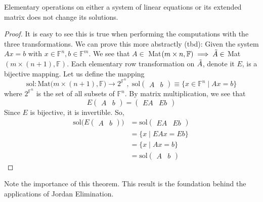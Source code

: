   \begin{theorem}
    Elementary operations on either a system of linear equations or its extended matrix does not change its solutions. 
  \end{theorem}
  \begin{proof}
    It is easy to see this is true when performing the computations with the three transformations. We can prove this more abstractly (tbd): Given the system $A x = b$ with $x \in \mathbb{F}^n, b \in \mathbb{F}^m$. We see that $A \in $ Mat$(m \times n, \mathbb{F}) \implies \Tilde{A} \in$ Mat$(m \times (n+1), \mathbb{F})$. Each elementary row transformation on $\Tilde{A}$, denote it $E$, is a bijective mapping. Let us define the mapping 
    \begin{equation}
      \text{sol}: \text{Mat}\big( m \times (n+1), \mathbb{F} \big) \longrightarrow 2^{\mathbb{F}^n}, \; \text{sol} \begin{pmatrix}
      A & b
      \end{pmatrix} \equiv \{ x\in \mathbb{F}^n \; | \; A x = b\} 
    \end{equation}
    where $2^{\mathbb{F}^n}$ is the set of all subsets of $\mathbb{F}^n$. By matrix multiplication, we see that 
    \begin{equation}
       E \begin{pmatrix}
      A & b
      \end{pmatrix} = \begin{pmatrix}
      E A & E b
      \end{pmatrix}
    \end{equation}
    Since $E$ is bijective, it is invertible. So, 
    \begin{align} 
      \text{sol} \big( E \begin{pmatrix}
      A & b \end{pmatrix} \big) & = \text{sol} \begin{pmatrix}
      E A & E b \end{pmatrix} \\ 
      & = \{ x \mid E A x = E b\} \\ 
      & = \{ x \mid A x = b\} \\ 
      & = \text{sol} \begin{pmatrix} A & b \end{pmatrix}
    \end{align}
  \end{proof}

  Note the importance of this theorem. This result is the foundation behind the applications of Jordan Elimination.

